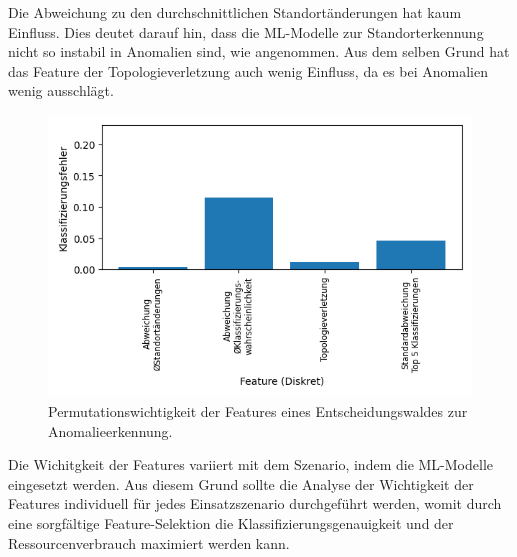 Die Abweichung zu den durchschnittlichen Standortänderungen hat kaum Einfluss.
Dies deutet darauf hin, dass die ML-Modelle zur Standorterkennung nicht so instabil in Anomalien sind, wie angenommen.
Aus dem selben Grund hat das Feature der Topologieverletzung auch wenig Einfluss, da es bei Anomalien wenig ausschlägt.
\begin{figure}[h!]
    \centering
    \includegraphics[width=0.65\linewidth]{images/fi_anomaly_dt.png}
    \caption{Permutationswichtigkeit der Features eines Entscheidungswaldes zur Anomalieerkennung.}
    \label{fig:feature_significance_dt_anomaly}
\end{figure}
\newpage
Die Wichitgkeit der Features variiert mit dem Szenario, indem die ML-Modelle eingesetzt werden.
Aus diesem Grund sollte die Analyse der Wichtigkeit der Features individuell für jedes Einsatzszenario durchgeführt werden,
womit durch eine sorgfältige Feature-Selektion die Klassifizierungsgenauigkeit und der Ressourcenverbrauch maximiert werden kann.